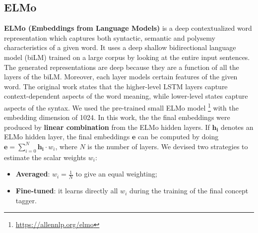\documentclass[11pt,a4paper]{article}
\begin{document}
\subsection{ELMo}
\textbf{ELMo (Embeddings from Language Models)} \cite{Peters:2018} is a deep contextualized word representation which captures both syntactic, semantic and polysemy characteristics of a given word. It uses a deep shallow bidirectional language model (biLM) trained on a large corpus by looking at the entire input sentences. The generated representations are deep because they are a function of all the layers of the biLM. Moreover, each layer models certain features of the given word. The original work states that the higher-level LSTM layers capture context-dependent aspects of the word meaning, while lower-level states capture aspects of the syntax.
We used the pre-trained small ELMo model \footnote{\url{https://allennlp.org/elmo}} with the embedding dimension of 1024.
In this work, the the final embeddings were produced by \textbf{linear combination} from the ELMo hidden layers. If $\mathbf{h_i}$ denotes an ELMo hidden layer, the final embeddings $\mathbf{e}$ can be computed by doing $\mathbf{e} = \sum_{i=0}^{N} \mathbf{h_i} \cdot w_i$, where $N$ is the number of layers. We devised two strategies to estimate the scalar weights $w_i$:
\begin{itemize}[noitemsep]
\item \textbf{Averaged}: $w_i = \frac{1}{N}$ to give an equal weighting; 
\item \textbf{Fine-tuned}: it learns directly all $w_i$ during the training of the final concept tagger.
\end{itemize}
\end{document}
